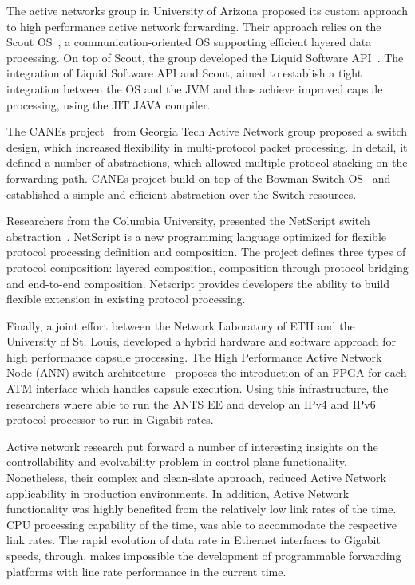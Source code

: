 The active networks group in University of Arizona proposed its custom approach
to high performance active network forwarding. Their approach relies on the
Scout OS~\cite{Montz1995}, a communication-oriented OS supporting efficient
layered data processing. On top of Scout, the group developed the Liquid
Software API~\cite{Hartman1999}. The integration of Liquid Software API and
Scout, aimed to establish a tight integration between the OS and the JVM and
thus achieve improved capsule processing, using the JIT JAVA compiler. 

The CANEs project~\cite{Chae2002} from Georgia Tech Active Network group
proposed a switch design, which increased flexibility in multi-protocol packet
processing. In detail, it defined a number of abstractions, which allowed
multiple protocol stacking on the forwarding path. CANEs project build on top of
the Bowman Switch OS~\cite{merugu1999} and established a simple and efficient
abstraction over the Switch resources. 

Researchers from the Columbia University, presented the NetScript switch
abstraction~\cite{daSilva2001}. NetScript is a new programming language
optimized for flexible protocol processing definition and composition. The
project defines three types of protocol composition: layered composition,
composition through protocol bridging and end-to-end composition. Netscript
provides developers the ability to build flexible extension in existing protocol processing. 

Finally, a joint effort between the Network Laboratory of ETH and the University
of St. Louis, developed a hybrid hardware and software approach for high
performance capsule processing. The High Performance Active Network Node (ANN)
switch architecture~\cite{Decasper1999} proposes the introduction of an FPGA for
each ATM interface which handles capsule execution. Using this infrastructure,
the researchers where able to run the ANTS EE and develop an IPv4 and IPv6
protocol processor to run in Gigabit rates. 

Active network research put forward a number of interesting insights on the
controllability and evolvability problem in control plane functionality.
Nonetheless, their complex and clean-slate approach, reduced Active Network
applicability in production environments. In addition, Active Network
functionality was highly benefited from the relatively low link rates of the
time. CPU processing capability of the time, was able to accommodate the
respective link rates. The rapid evolution of data rate in Ethernet interfaces
to Gigabit speeds, through, makes impossible the development of programmable
forwarding platforms with line rate performance in the current time. 

